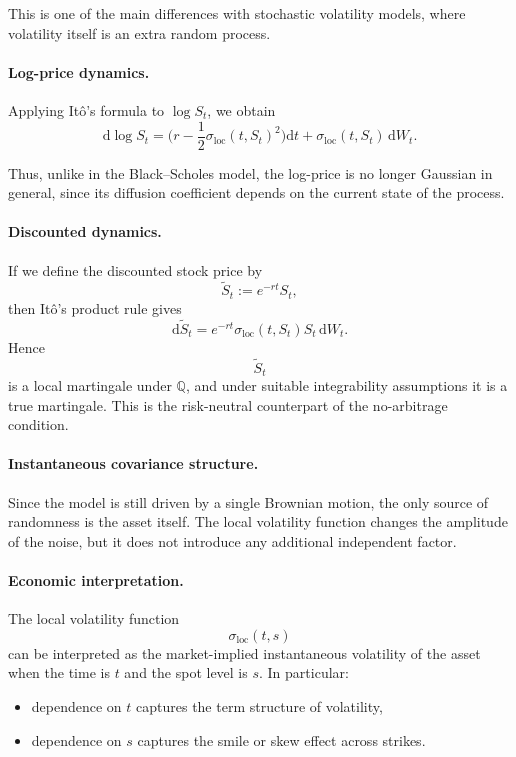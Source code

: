 \documentclass[11pt]{article}
\newcommand{\Qbb}{\mathbb{Q}}
\theoremstyle{plain}
\theoremstyle{definition}
\theoremstyle{remark}
\begin{document}
This is one of the main differences with stochastic volatility models,
where volatility itself is an extra random process.

\paragraph{Log-price dynamics.}
Applying It\^o's formula to \(\log S_t\), we obtain
\[
\mathrm{d}\log S_t
=
\Big(
r-\frac12\sigma_{\mathrm{loc}}(t,S_t)^2
\Big)\mathrm{d}t
+
\sigma_{\mathrm{loc}}(t,S_t)\,\mathrm{d}W_t.
\]

Thus, unlike in the Black--Scholes model, the log-price is no longer
Gaussian in general, since its diffusion coefficient depends on the
current state of the process.

\paragraph{Discounted dynamics.}
If we define the discounted stock price by
\[
\widetilde S_t:=e^{-rt}S_t,
\]
then It\^o's product rule gives
\[
\mathrm{d}\widetilde S_t
=
e^{-rt}\sigma_{\mathrm{loc}}(t,S_t)S_t\,\mathrm{d}W_t.
\]
Hence
\[
\widetilde S_t
\]
is a local martingale under \(\Qbb\), and under suitable integrability
assumptions it is a true martingale.
This is the risk-neutral counterpart of the no-arbitrage condition.

\paragraph{Instantaneous covariance structure.}
Since the model is still driven by a single Brownian motion, the only
source of randomness is the asset itself.
The local volatility function changes the amplitude of the noise, but it
does not introduce any additional independent factor.

\paragraph{Economic interpretation.}
The local volatility function
\[
\sigma_{\mathrm{loc}}(t,s)
\]
can be interpreted as the market-implied instantaneous volatility of the
asset when the time is \(t\) and the spot level is \(s\).
In particular:
\begin{itemize}[leftmargin=1.4em]
    \item dependence on \(t\) captures the term structure of volatility,
    \item dependence on \(s\) captures the smile or skew effect across strikes.
\end{itemize}
\end{document}

